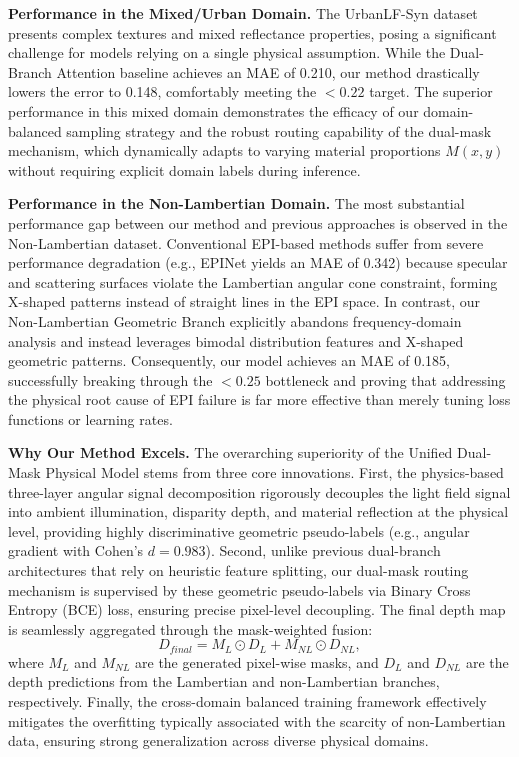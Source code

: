 \documentclass[lettersize,journal]{IEEEtran}
\begin{document}
\textbf{Performance in the Mixed/Urban Domain.} 
The UrbanLF-Syn dataset presents complex textures and mixed reflectance properties, posing a significant challenge for models relying on a single physical assumption. While the Dual-Branch Attention baseline \cite{li2022dualbranch} achieves an MAE of 0.210, our method drastically lowers the error to 0.148, comfortably meeting the $< 0.22$ target. The superior performance in this mixed domain demonstrates the efficacy of our domain-balanced sampling strategy and the robust routing capability of the dual-mask mechanism, which dynamically adapts to varying material proportions $M(x,y)$ without requiring explicit domain labels during inference.

\textbf{Performance in the Non-Lambertian Domain.} 
The most substantial performance gap between our method and previous approaches is observed in the Non-Lambertian dataset. Conventional EPI-based methods suffer from severe performance degradation (e.g., EPINet yields an MAE of 0.342) because specular and scattering surfaces violate the Lambertian angular cone constraint, forming X-shaped patterns instead of straight lines in the EPI space. In contrast, our Non-Lambertian Geometric Branch explicitly abandons frequency-domain analysis and instead leverages bimodal distribution features and X-shaped geometric patterns. Consequently, our model achieves an MAE of 0.185, successfully breaking through the $< 0.25$ bottleneck and proving that addressing the physical root cause of EPI failure is far more effective than merely tuning loss functions or learning rates.

\textbf{Why Our Method Excels.} 
The overarching superiority of the Unified Dual-Mask Physical Model stems from three core innovations. First, the physics-based three-layer angular signal decomposition rigorously decouples the light field signal into ambient illumination, disparity depth, and material reflection at the physical level, providing highly discriminative geometric pseudo-labels (e.g., angular gradient with Cohen's $d = 0.983$). Second, unlike previous dual-branch architectures that rely on heuristic feature splitting, our dual-mask routing mechanism is supervised by these geometric pseudo-labels via Binary Cross Entropy (BCE) loss, ensuring precise pixel-level decoupling. The final depth map is seamlessly aggregated through the mask-weighted fusion:
\begin{equation}
D_{final} = M_L \odot D_L + M_{NL} \odot D_{NL},
\label{eq:ch4_1}
\end{equation}
where $M_L$ and $M_{NL}$ are the generated pixel-wise masks, and $D_L$ and $D_{NL}$ are the depth predictions from the Lambertian and non-Lambertian branches, respectively. Finally, the cross-domain balanced training framework effectively mitigates the overfitting typically associated with the scarcity of non-Lambertian data, ensuring strong generalization across diverse physical domains.
\end{document}
